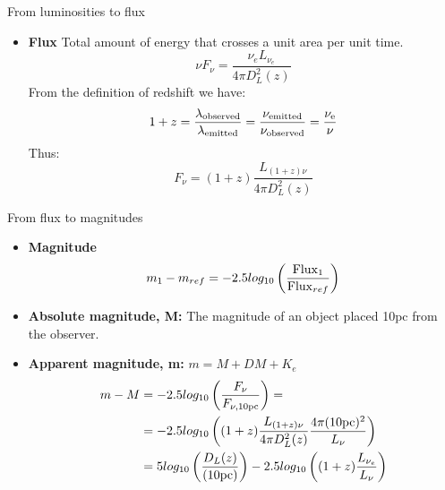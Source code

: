 \documentclass{beamer}
\begin{document}
\begin{frame}{From luminosities to flux}
\begin{itemize}
\item {\bf Flux} Total amount of energy that crosses a unit area per unit time.
\begin{equation*}
\nu F_{\nu} = \frac{\nu_eL_{\nu_e}}{4\pi D_L^2(z)}
\end{equation*}
From the definition of redshift we have:
\begin{equation*}
1 + z = \frac{\lambda_{\rm observed}}{\lambda_{\rm emitted}}=\frac{\nu_{\rm emitted}}{\nu_{\rm observed}}=\frac{\nu_{\rm e}}{\nu}
\end{equation*}
Thus:
\begin{equation*}
F_{\nu} = (1+z)\frac{L_{(1+z)\nu}}{4\pi D_L^2(z)} 
\end{equation*}
\end{itemize}
\end{frame}


\begin{frame}{From flux to magnitudes}
\begin{itemize}
\item {\bf Magnitude}
\begin{equation*}
m_1 - m_{ref} = -2.5log_{10}\left(\frac{{\rm Flux}_1}{{\rm Flux}_{ref}}\right)
\end{equation*}
\item {\bf Absolute magnitude, M:} The magnitude of an object placed 10pc from the observer. 
\item {\bf Apparent magnitude, m:} $m = M + DM + K_e$
\begin{align*}
m - M &= -2.5log_{10}\left(\frac{F_{\nu}}{F_{\nu,{10\rm pc}}}\right) = \\
&= -2.5log_{10}\left((1+z)\frac{L_{(1+z)\nu}}{4\pi D_L^2(z)}\frac{4\pi (10{\rm pc})^2}{L_{\nu}}\right) \\
&= 5log_{10}\left(\frac{D_L(z)}{(10{\rm pc})}\right)  - 2.5log_{10}\left((1+z)\frac{L_{\nu_e}}{L_{\nu}}\right) 
\end{align*}
\end{itemize}
\end{frame}
\end{document}
